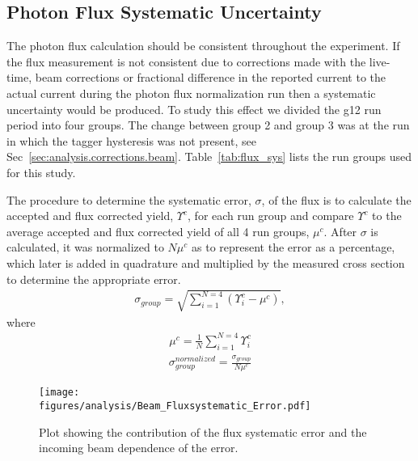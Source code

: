  		\subsection{Photon Flux Systematic Uncertainty}
 		The photon flux calculation should be consistent throughout the experiment. If the flux measurement is not consistent due to corrections made with the live-time, beam corrections or fractional difference in the reported current to the actual current during the photon flux normalization run then a systematic uncertainty would be produced. To study this effect we divided the g12 run period into four groups. The change between group 2 and group 3 was at the run in which the tagger hysteresis was not present, see Sec~\ref{sec:analysis.corrections.beam}. Table~\ref{tab:flux_sys} lists the run groups used for this study.
 		
 		
 		The procedure to determine the systematic error, $\sigma$, of the flux is to calculate the accepted and flux corrected yield, $\Upsilon^c$, for each run group and compare $\Upsilon^c$ to the average accepted and flux corrected yield of all 4 run groups, $\mu^c$. After $\sigma$ is calculated, it was normalized to $N \mu^c$ as to represent the error as a percentage, which later is added in quadrature and  multiplied by the measured cross section to determine the appropriate error. 
 		\begin{align}
 			\sigma_{group} = \sqrt{\sum_{i=1}^{N = 4}\left(\Upsilon_i^c - \mu^c\right)},
 		\end{align}
 		where
 		\begin{align}
 			\mu^c = \frac{1}{N}\sum_{i=1}^{N=4}\Upsilon_i^c
 		\end{align}
 		\begin{align}
 			\sigma_{group}^{normalized} = \frac{\sigma_{group}}{N\mu^c}
 		\end{align}
 		
 		\begin{figure}[h!]\begin{center}
 				\texttt{[image: \\figures/analysis/Beam\_Fluxsystematic\_Error.pdf]}
 				\caption[Plot showing the contribution of the flux systematic error and the incoming beam dependence of the error]{\label{fig:sys_flux_error} Plot showing the contribution of the flux systematic error and the incoming beam dependence of the error.}
 			\end{center}\end{figure}
 			\FloatBarrier
 			
